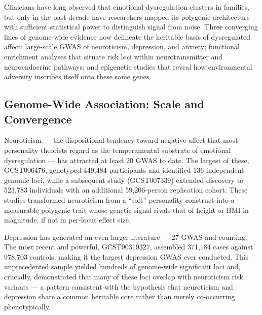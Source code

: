 



Clinicians have long observed that emotional dysregulation clusters in families,
but only in the past decade have researchers mapped its polygenic architecture
with sufficient statistical power to distinguish signal from noise.
Three converging lines of genome-wide evidence now delineate the heritable
basis of dysregulated affect: large-scale GWAS of neuroticism, depression, and
anxiety; functional enrichment analyses that situate risk loci within
neurotransmitter and neuroendocrine pathways; and epigenetic studies that reveal
how environmental adversity inscribes itself onto these same genes.

\subsection*{Genome-Wide Association: Scale and Convergence}

Neuroticism — the dispositional tendency toward negative affect that most
personality theorists regard as the temperamental substrate of emotional
dysregulation — has attracted at least 20 GWAS to date.
The largest of these, GCST006476, genotyped 449,484 participants and identified
136 independent genomic loci, while a subsequent study (GCST007339) extended
discovery to 523,783 individuals with an additional 59,206-person replication
cohort.
These studies transformed neuroticism from a ``soft'' personality construct into
a measurable polygenic trait whose genetic signal rivals that of height or
BMI in magnitude, if not in per-locus effect size.

Depression has generated an even larger literature — 27 GWAS and counting.
The most recent and powerful, GCST90319327, assembled 371,184 cases against
978,703 controls, making it the largest depression GWAS ever
conducted.
This unprecedented sample yielded hundreds of genome-wide significant loci and,
crucially, demonstrated that many of these loci overlap with neuroticism risk
variants — a pattern consistent with the hypothesis that neuroticism and
depression share a common heritable core rather than merely co-occurring
phenotypically.

